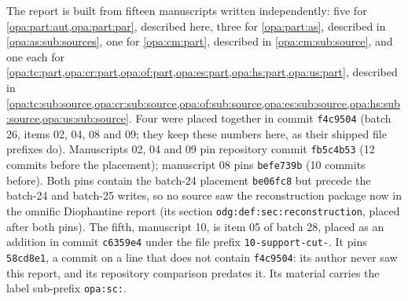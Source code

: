 \documentclass[11pt,oneside]{article}
\numberwithin{equation}{section}
\theoremstyle{definition}
\theoremstyle{remark}
\newcommand{\lbl}[1]{\nolinkurl{#1}}
\newcommand{\fn}[1]{\nolinkurl{#1}}
\begin{document}
The report is built from fifteen manuscripts written independently: five for
\cref{opa:part:aut,opa:part:par}, described here, three for
\cref{opa:part:as}, described in \cref{opa:as:sub:sources}, one for
\cref{opa:cm:part}, described in \cref{opa:cm:sub:source}, and one each for
\cref{opa:tc:part,opa:cr:part,opa:of:part,opa:es:part,opa:hs:part,opa:us:part}, described in
\cref{opa:tc:sub:source,opa:cr:sub:source,opa:of:sub:source,opa:es:sub:source,opa:hs:sub:source,opa:us:sub:source}. Four were
placed together in commit \texttt{f4c9504} (batch 26, items 02, 04, 08 and
09; they keep these numbers here, as their shipped file prefixes do).
Manuscripts 02, 04 and 09 pin repository commit \texttt{fb5c4b53} (12 commits
before the placement); manuscript 08 pins \texttt{befe739b} (10 commits
before). Both pins contain the batch-24 placement \texttt{be06fc8} but
precede the batch-24 and batch-25 writes, so no source saw the reconstruction
package now in the omnific Diophantine report (its section
\lbl{odg:def:sec:reconstruction}, placed after both pins). The fifth,
manuscript 10, is item 05 of batch 28, placed as an addition in commit
\texttt{c6359e4} under the file prefix \fn{10-support-cut-}. It pins
\texttt{58cd8e1}, a commit on a line that does not contain \texttt{f4c9504}:
its author never saw this report, and its repository comparison predates it.
Its material carries the label sub-prefix \lbl{opa:sc:}.
\end{document}
